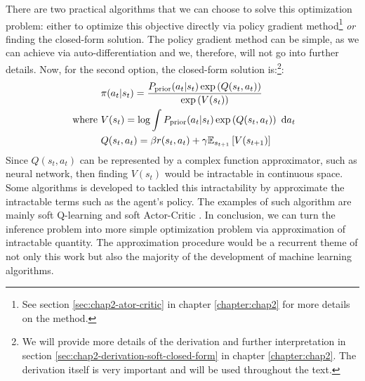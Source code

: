 There are two practical algorithms that we can choose to solve this optimization problem: either to optimize this objective directly via policy gradient method\footnote{See section \ref{sec:chap2-ator-critic} in chapter \ref{chapter:chap2} for more details on the method.} \textit{or} finding the closed-form solution. The policy gradient method can be simple, as we can achieve via auto-differentiation and we, therefore, will not go into further details. Now, for the second option, the closed-form solution is:\footnote{We will provide more details of the derivation and further interpretation in section \ref{sec:chap2-derivation-soft-closed-form} in chapter \ref{chapter:chap2}. The derivation itself is very important and will be used throughout the text.}:
\begin{equation}
\begin{aligned}
    &\pi(a_t | s_t) = \frac{P_{\text{prior}}(a_t | s_t) \exp\left( Q(s_t, a_t) \right)}{\exp\left( V(s_t) \right)} \\
    \text{ where }& V(s_t) = \log \int P_{\text{prior}}(a_t | s_t) \exp\left( Q(s_t, a_t) \right) \ \mathrm{d} a_t \\
    &Q(s_t, a_t) = \beta r(s_t, a_t) + \gamma\mathbb{E}_{s_{t+1}}\left[ V(s_{t+1}) \right]
\end{aligned}
\end{equation}
Since $Q(s_t, a_t)$ can be represented by a complex function approximator, such as neural network, then finding $V(s_t)$ would be intractable in continuous space. Some algorithms is developed to tackled this intractability by approximate the intractable terms such as the agent's policy. The examples of such algorithm are mainly soft Q-learning \cite{haarnoja2017reinforcement} and soft Actor-Critic \cite{haarnoja2018softa, haarnoja2018softb}. In conclusion, we can turn the inference problem into more simple optimization problem via approximation of intractable quantity. The approximation procedure would be a recurrent theme of not only this work but also the majority of the development of machine learning algorithms.  

